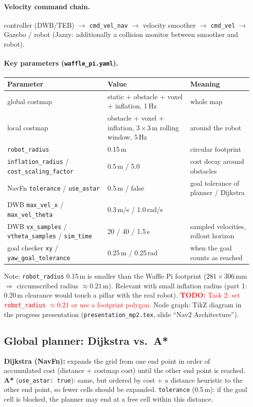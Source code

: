 \documentclass[10pt]{article}
\newcommand{\todo}[1]{\textcolor{red}{\textbf{TODO:} #1}}
\newcommand{\pkg}[1]{\texttt{#1}}
\begin{document}
\paragraph{Velocity command chain.}
controller (DWB/TEB) $\rightarrow$ \pkg{cmd\_vel\_nav} $\rightarrow$ velocity smoother $\rightarrow$
\pkg{cmd\_vel} $\rightarrow$ Gazebo / robot (Jazzy: additionally a collision monitor between smoother and robot).

\paragraph{Key parameters (\pkg{waffle\_pi.yaml}).}
\begin{tabular}{lll}
\toprule
Parameter & Value & Meaning \\
\midrule
global costmap & static + obstacle + voxel + inflation, 1\,Hz & whole map \\
local costmap & obstacle + voxel + inflation, $3\times3$\,m rolling window, 5\,Hz & around the robot \\
\pkg{robot\_radius} & 0.15\,m & circular footprint \\
\pkg{inflation\_radius} / \pkg{cost\_scaling\_factor} & 0.5\,m / 5.0 & cost decay around obstacles \\
NavFn \pkg{tolerance} / \pkg{use\_astar} & 0.5\,m / false & goal tolerance of planner / Dijkstra \\
DWB \pkg{max\_vel\_x} / \pkg{max\_vel\_theta} & 0.3\,m/s / 1.0\,rad/s & \\
DWB \pkg{vx\_samples} / \pkg{vtheta\_samples} / \pkg{sim\_time} & 20 / 40 / 1.5\,s & sampled velocities, rollout horizon \\
goal checker \pkg{xy} / \pkg{yaw\_goal\_tolerance} & 0.25\,m / 0.25\,rad & when the goal counts as reached \\
\bottomrule
\end{tabular}

Note: \pkg{robot\_radius} 0.15\,m is smaller than the Waffle Pi footprint ($281\times306$\,mm $\Rightarrow$
circumscribed radius $\approx 0.21$\,m). Relevant with small inflation radius (part 1: 0.20\,m clearance would
touch a pillar with the real robot). \todo{Task 2: set \pkg{robot\_radius} $\approx 0.21$ or use a footprint polygon.}
Node graph: TikZ diagram in the progress presentation (\pkg{presentation\_mp2.tex}, slide ``Nav2 Architecture'').

\subsection{Global planner: Dijkstra vs.\ A*}
\textbf{Dijkstra (NavFn):} expands the grid from one end point in order of accumulated cost (distance + costmap
cost) until the other end point is reached. \textbf{A*} (\pkg{use\_astar: true}): same, but ordered by cost + a
distance heuristic to the other end point, so fewer cells should be expanded. \pkg{tolerance} (0.5\,m): if the goal
cell is blocked, the planner may end at a free cell within this distance.
\end{document}

